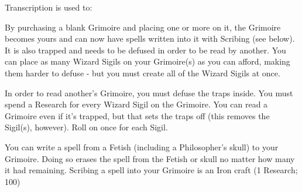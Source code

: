 {



Transcription is used to: 


By purchasing a blank Grimoire and placing one or more  on it, the Grimoire becomes yours and can now have spells written into it with Scribing (see below).  It is also trapped and needs to be defused in order to be read by another.   You can place as many Wizard Sigils on your Grimoire(s) as you can afford, making them harder to defuse - but you must create all of the Wizard Sigils at once.


In order to read another's Grimoire, you must defuse the traps inside.  You must spend a Research for every Wizard Sigil on the Grimoire.  You can read a Grimoire even if it's trapped, but that sets the traps off (this removes the Sigil(s), however).  Roll on  once for each Sigil.


You can write a spell from a Fetish (including a Philosopher's skull) to your Grimoire.  Doing so erases the spell from the Fetish or skull no matter how many \UD it had remaining.  Scribing a spell into your Grimoire is an Iron craft (1 Research; 100\FE)


}
